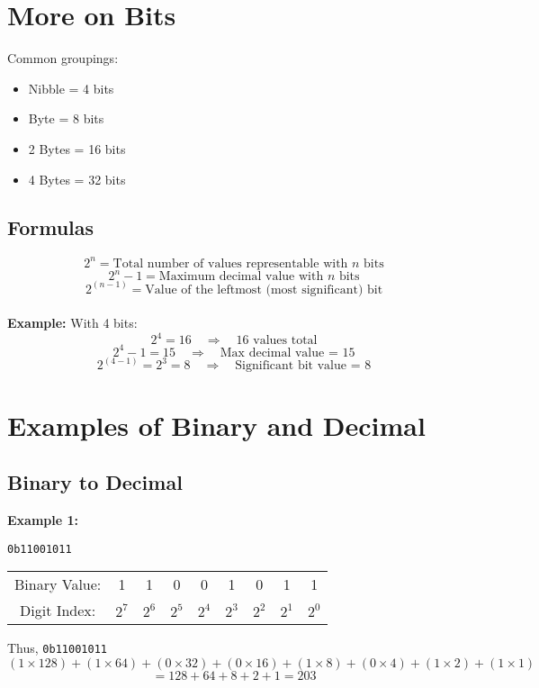 \documentclass{article}
\begin{document}
\section{More on Bits}
Common groupings:
\begin{itemize}
  \item Nibble = 4 bits
  \item Byte = 8 bits
  \item 2 Bytes = 16 bits
  \item 4 Bytes = 32 bits
\end{itemize}

\subsection*{Formulas}
\[
2^n = \text{Total number of values representable with $n$ bits}
\]
\[
2^n - 1 = \text{Maximum decimal value with $n$ bits}
\]
\[
2^{(n-1)} = \text{Value of the leftmost (most significant) bit}
\] \\

\textbf{Example:} With 4 bits:  
\[
2^4 = 16 \quad \Rightarrow \quad \text{16 values total}
\]
\[
2^4 - 1 = 15 \quad \Rightarrow \quad \text{Max decimal value = 15}
\]
\[
2^{(4-1)} = 2^3 = 8 \quad \Rightarrow \quad \text{Significant bit value = 8}
\]
\section{Examples of Binary and Decimal}

\subsection*{Binary to Decimal}
\textbf{Example 1:}

\texttt{0b11001011}

\begin{center}
\begin{tabular}{c c c c c c c c c}
Binary Value: & 1 & 1 & 0 & 0 & 1 & 0 & 1 & 1 \\
Digit Index:  & $2^7$ & $2^6$ & $2^5$ & $2^4$ & $2^3$ & $2^2$ & $2^1$ & $2^0$ \\
\end{tabular}
\end{center} 

\noindent Thus, \texttt{0b11001011}
\[
(1 \times 128) + (1 \times 64) + (0 \times 32) + (0 \times 16) + (1 \times 8) + (0 \times 4) + (1 \times 2) + (1 \times 1)
\]
\[
= 128 + 64 + 8 + 2 + 1 = 203
\]
\end{document}
